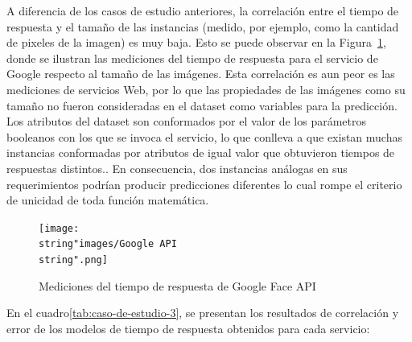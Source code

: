 A diferencia de los casos de estudio anteriores, la correlación entre
el tiempo de respuesta y el tamaño de las instancias (medido, por
ejemplo, como la cantidad de pixeles de la imagen) es muy baja. Esto
se puede observar en la Figura~\ref{fig:Mediciones-del-tiempo-google-face-api},
donde se ilustran las mediciones del tiempo de respuesta para el servicio
de Google respecto al tamaño de las imágenes. Esta correlación es
aun peor es las mediciones de servicios Web, por lo que las propiedades
de las imágenes como su tamaño no fueron consideradas en el dataset
como variables para la predicción. Los atributos del dataset son conformados
por el valor de los parámetros booleanos con los que se invoca el
servicio, lo que conlleva a que existan muchas instancias conformadas
por atributos de igual valor que obtuvieron tiempos de respuestas
distintos.. En consecuencia, dos instancias análogas en sus requerimientos
podrían producir predicciones diferentes lo cual rompe el criterio
de unicidad de toda función matemática.

\begin{figure}
\begin{centering}
\texttt{[image: \\string"images/Google API\\string".png]}~
\par\end{centering}

\caption{Mediciones del tiempo de respuesta de Google Face API\label{fig:Mediciones-del-tiempo-google-face-api}}
\end{figure}


En el cuadro\ref{tab:caso-de-estudio-3}, se presentan los resultados
de correlación y error de los modelos de tiempo de respuesta obtenidos
para cada servicio:


